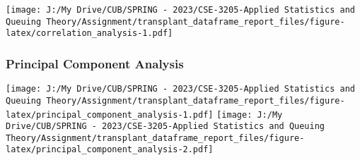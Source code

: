 \documentclass[
]{article}
\begin{document}
\texttt{[image: J:/My Drive/CUB/SPRING - 2023/CSE-3205-Applied Statistics and Queuing Theory/Assignment/transplant\_dataframe\_report\_files/figure-latex/correlation\_analysis-1.pdf]}

\hypertarget{principal-component-analysis}{%
\subsubsection{Principal Component
Analysis}\label{principal-component-analysis}}

\texttt{[image: J:/My Drive/CUB/SPRING - 2023/CSE-3205-Applied Statistics and Queuing Theory/Assignment/transplant\_dataframe\_report\_files/figure-latex/principal\_component\_analysis-1.pdf]}
\texttt{[image: J:/My Drive/CUB/SPRING - 2023/CSE-3205-Applied Statistics and Queuing Theory/Assignment/transplant\_dataframe\_report\_files/figure-latex/principal\_component\_analysis-2.pdf]}
\end{document}
